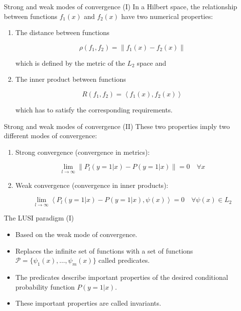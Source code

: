 \documentclass[10pt, dvipsnames]{beamer}
\newcommand{\norm}[1]{\lVert #1 \rVert}
\newcommand{\innerprod}[1]{\left< #1 \right>}
\newcommand{\set}[1]{\lbrace #1 \rbrace}
\begin{document}
\begin{frame}{Strong and weak modes of convergence (I)}
     In a Hilbert space, the relationship between functions $f_1(x)$ and $f_2(x)$ have two
    numerical properties:
    
        \begin{enumerate}
        \item<2-> The distance between functions
        
        \[
            \rho (f_1, f_2) = \norm{f_1(x) - f_2(x)}
        \]
        
        which is defined by the metric of the $L_2$ space and
        
        \item<3-> The inner product between functions
        
        \[
            R(f_1, f_2) = \innerprod{f_1(x), f_2(x)}
        \]
        
        which has to satisfy the corresponding requirements.
    \end{enumerate}
\end{frame}

\begin{frame}{Strong and weak modes of convergence (II)}
     These two properties imply two different modes of convergence:
    
    \begin{enumerate}
        \item<2-> Strong convergence (convergence in metrics):
        
        \[
    \lim_{l \to \infty} \norm{P_l(y=1 | x) - P(y=1 | x)} = 0\quad \forall x
\]
        
        \item<3-> Weak convergence (convergence in inner products):
        
        \[
    \lim_{l \to \infty} \innerprod{P_l(y=1 | x) - P(y=1 | x), \psi(x)} = 0\quad \forall \psi(x) \in L_2
\]
    \end{enumerate}
\end{frame}

\begin{frame}{The LUSI paradigm (I)}
    \begin{itemize}
        \item<1-> Based on the \alert{weak} mode of convergence.
        \item<2-> Replaces the infinite set of functions with a set of functions
        $\mathcal{P} = \set{\psi_1(x), \dots, \psi_m(x)}$ called predicates.
        \item<3-> The predicates describe important properties of the desired conditional
        probability function $P(y=1 | x)$.
        \item<4-> These important properties are called \alert{invariants}.
    \end{itemize}
\end{frame}
\end{document}
